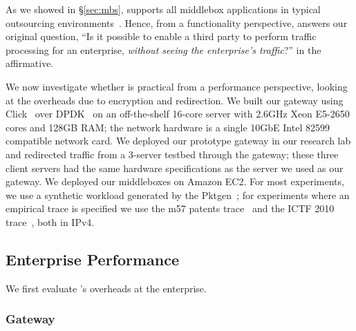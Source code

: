 As we showed in \S\ref{sec:mbs}, \sys supports all middlebox applications in typical outsourcing environments~\cite{aplomb,etsi-nfv}. Hence, from a functionality perspective, \sys answers our original question, ``Is it possible to enable a third party to perform traffic processing for an enterprise, {\em without seeing the enterprise's traffic}?''  in the affirmative.

We now investigate whether \sys is practical from a performance perspective, looking at the overheads due to encryption and redirection. 
We built our gateway using Click~\cite{click} over DPDK~\cite{dpdk} on an off-the-shelf 16-core server with 2.6GHz Xeon E5-2650 cores and 128GB RAM; the network hardware is a single 10GbE Intel 82599 compatible network card. 
We deployed our prototype gateway in our research lab and redirected traffic from a 3-server testbed through the gateway; these three client servers had the same hardware specifications as the server we used as our gateway.
We deployed our middleboxes on Amazon EC2.
For most experiments, we use a synthetic workload generated by the Pktgen~\cite{pktgen}; for experiments where an empirical trace is specified we use the m57 patents trace~\cite{m57} and the ICTF 2010 trace~\cite{ictf}, both in IPv4.


\subsection{Enterprise Performance}
\label{sec:enterprise}
We first evaluate \sys's overheads at the enterprise. %

\subsubsection{Gateway}

